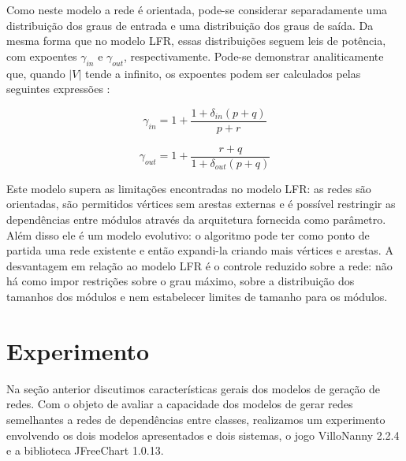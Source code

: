 \documentclass{acm_proc_article-sp}
\begin{document}
Como neste modelo a rede é orientada, pode-se considerar separadamente uma distribuição dos graus de entrada e uma distribuição dos graus de saída. Da mesma forma que no modelo LFR, essas distribuições seguem leis de potência, com expoentes $\gamma_{in}$ e $\gamma_{out}$, respectivamente. Pode-se demonstrar analiticamente que, quando $|V|$ tende a infinito, os expoentes podem ser calculados pelas seguintes expressões \cite{Bollobas2003}:

\begin{equation}
\gamma_{in} = 1 + \frac{1 + \delta_{in}(p + q)}{p + r}
\end{equation}

\begin{equation}
\gamma_{out} = 1 + \frac{r + q}{1 + \delta_{out}(p + q)}
\end{equation}


Este modelo supera as limitações encontradas no modelo LFR: as redes são orientadas, são permitidos vértices sem arestas externas e é possível restringir as dependências entre módulos através da arquitetura fornecida como parâmetro. Além disso ele é um modelo evolutivo: o algoritmo pode ter como ponto de partida uma rede existente e então expandi-la criando mais vértices e arestas. A desvantagem em relação ao modelo LFR é o controle reduzido sobre a rede: não há como impor restrições sobre o grau máximo, sobre a distribuição dos tamanhos dos módulos e nem estabelecer limites de tamanho para os módulos.


\section{Experimento} \label{sec:experimento}

Na seção anterior discutimos características gerais dos modelos de geração de redes. Com o objeto de avaliar a capacidade dos modelos de gerar redes semelhantes a redes de dependências entre classes, realizamos um experimento envolvendo os dois modelos apresentados e dois sistemas, o jogo VilloNanny 2.2.4 e a biblioteca JFreeChart 1.0.13. 
\end{document}
